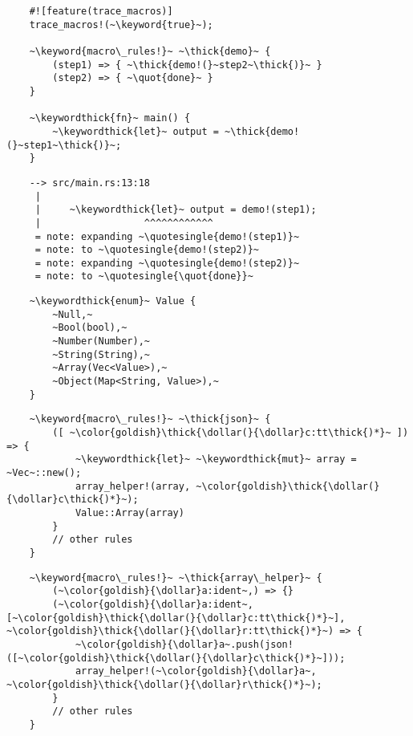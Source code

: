 \documentclass[usepdftitle=false,aspectratio=169]{beamer}
\newcommand{\dollar}{\makebox[\widthof{\$}][c]{\$}}
\newcommand{\thick}[1]{\contourlength{0.16pt}\contour[10]{black}{#1}}
\newcommand{\slantbox}[2][.5]
  {%
    \mbox
      {%
        \sbox{\foobox}{#2}%
        \hskip\wd\foobox
        \pdfsave
        \pdfsetmatrix{1 0 #1 1}%
        \llap{\usebox{\foobox}}%
        \pdfrestore
      }%
  }
\newcommand{\backslantbox}[2][.5]
  {%
    \mbox
      {%
        \sbox{\foobox}{#2}%
        \hskip\wd\foobox
        \pdfsave
        \pdfsetmatrix{-1 0 #1 1}%
        \llap{\usebox{\foobox}}%
        \pdfrestore
      }%
  }
\newcommand{\openquote}{\backslantbox[.2]{\hspace{11pt}''\hspace{-11pt}}}
\newcommand{\closequote}{\slantbox[-.2]{\hspace{2pt}''\hspace{-2pt}}}
\newcommand{\openquotesingle}{\backslantbox[.2]{\hspace{11pt}'\hspace{-11pt}}}
\newcommand{\closequotesingle}{\slantbox[-.2]{\hspace{2pt}'\hspace{-2pt}}}
\newcommand{\blackquote}[1]{\openquote#1\closequote}
\newcommand{\quot}[1]{{\color{redish}\blackquote{#1}}}
\newcommand{\quotesingle}[1]{\openquotesingle#1\closequotesingle}
\newcommand{\keyword}[1]{\color{greenish}#1}
\newcommand{\keywordthick}[1]{\color{greenish}\contourlength{0.20pt}\contour[10]{greenish}{#1}}
\begin{document}

\begin{frame}
\end{frame}

\begin{frame}[fragile]
  \begin{verbatim}
    #![feature(trace_macros)]
    trace_macros!(~\keyword{true}~);

    ~\keyword{macro\_rules!}~ ~\thick{demo}~ {
        (step1) => { ~\thick{demo!(}~step2~\thick{)}~ }
        (step2) => { ~\quot{done}~ }
    }

    ~\keywordthick{fn}~ main() {
        ~\keywordthick{let}~ output = ~\thick{demo!(}~step1~\thick{)}~;
    }
  \end{verbatim}
\end{frame}

\begin{frame}[fragile]
  \begin{verbatim}
    --> src/main.rs:13:18
     |
     |     ~\keywordthick{let}~ output = demo!(step1);
     |                  ^^^^^^^^^^^^
     = note: expanding ~\quotesingle{demo!(step1)}~
     = note: to ~\quotesingle{demo!(step2)}~
     = note: expanding ~\quotesingle{demo!(step2)}~
     = note: to ~\quotesingle{\quot{done}}~
  \end{verbatim}
\end{frame}

\begin{frame}[fragile]
  \begin{verbatim}
    ~\keywordthick{enum}~ Value {
        ~Null,~
        ~Bool(bool),~
        ~Number(Number),~
        ~String(String),~
        ~Array(Vec<Value>),~
        ~Object(Map<String, Value>),~
    }
  \end{verbatim}
\end{frame}

\begin{frame}[fragile]
  \begin{verbatim}
    ~\keyword{macro\_rules!}~ ~\thick{json}~ {
        ([ ~\color{goldish}\thick{\dollar(}{\dollar}c:tt\thick{)*}~ ]) => {
            ~\keywordthick{let}~ ~\keywordthick{mut}~ array = ~Vec~::new();
            array_helper!(array, ~\color{goldish}\thick{\dollar(}{\dollar}c\thick{)*}~);
            Value::Array(array)
        }
        // other rules
    }
  \end{verbatim}
\end{frame}

\begin{frame}[fragile]
  \begin{verbatim}
    ~\keyword{macro\_rules!}~ ~\thick{array\_helper}~ {
        (~\color{goldish}{\dollar}a:ident~,) => {}
        (~\color{goldish}{\dollar}a:ident~, [~\color{goldish}\thick{\dollar(}{\dollar}c:tt\thick{)*}~], ~\color{goldish}\thick{\dollar(}{\dollar}r:tt\thick{)*}~) => {
            ~\color{goldish}{\dollar}a~.push(json!([~\color{goldish}\thick{\dollar(}{\dollar}c\thick{)*}~]));
            array_helper!(~\color{goldish}{\dollar}a~, ~\color{goldish}\thick{\dollar(}{\dollar}r\thick{)*}~);
        }
        // other rules
    }
  \end{verbatim}
\end{frame}
\end{document}
